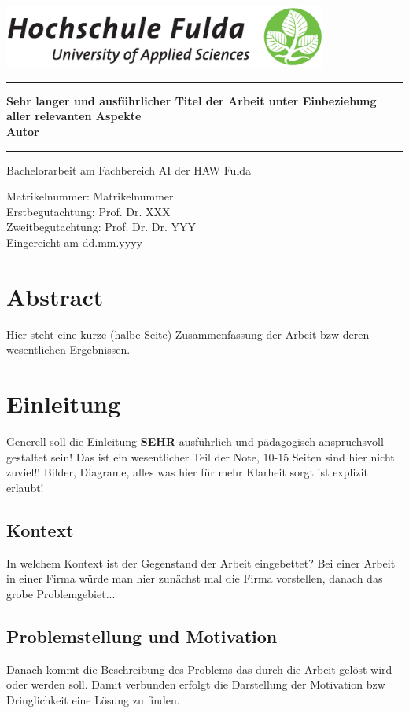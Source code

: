 \documentclass[12pt,oneside]{article}
\newcommand{\HSFTitle}[8]{

  \thispagestyle{empty}
\begin{center}
    \includegraphics[width=0.8\textwidth]{logo.eps} \\
    \vspace*{\stretch{1}}
    \end{center}

  {\parindent0cm
  \rule{\linewidth}{.7ex}}
  \begin{center}
    \vspace*{\stretch{1}}
    \sffamily\bfseries\Huge
    #1\\
    \vspace*{\stretch{1}}
    \sffamily\bfseries\large
    #3
    \vspace*{\stretch{1}}
  \end{center}
  \rule{\linewidth}{.7ex}

  \vspace*{\stretch{2}}
  \begin{center}
    \Large #2 am #5 der HAW Fulda \\
    \vspace*{\stretch{1}}

    \large Matrikelnummer:  #4 \\[1mm]
    \large Erstbegutachtung:  #7 \\[1mm]
    \large Zweitbegutachtung:  #8 \\[1mm]

    \vspace*{\stretch{1}}
    \large Eingereicht am #6
  \end{center}
}
\begin{document}
  \HSFTitle
      {Sehr langer und ausführlicher Titel der Arbeit unter Einbeziehung aller relevanten Aspekte }        %
      {Bachelorarbeit} %
      {Autor}          %
      {Matrikelnummer}
      {Fachbereich AI}  %
      {dd.mm.yyyy}        %
      {Prof. Dr. XXX}     %
      {Prof. Dr. Dr. YYY}    %

  \clearpage

\lhead{}
    \setcounter{page}{1}

\clearpage
%
\section*{Abstract}
Hier steht eine kurze (halbe Seite) Zusammenfassung der Arbeit bzw deren wesentlichen Ergebnissen.
\clearpage
\tableofcontents
\clearpage

\listoffigures

\listoftables
\clearpage


\cleardoublepage
{}
    \setcounter{page}{1}
\lhead{\nouppercase{\leftmark}}


\section{Einleitung} \label{sec:einleitung}
Generell soll die Einleitung \textbf{SEHR} ausführlich und pädagogisch anspruchsvoll gestaltet sein! Das ist ein wesentlicher Teil der Note, 10-15 Seiten sind hier nicht zuviel!!
Bilder, Diagrame, alles was hier für mehr Klarheit sorgt ist explizit erlaubt!
%
\subsection{Kontext}
In welchem Kontext ist der Gegenstand der Arbeit eingebettet? Bei einer Arbeit in einer Firma würde man hier zunächst mal die Firma vorstellen, danach das grobe Problemgebiet...
%
\subsection{Problemstellung und Motivation}
Danach kommt die Beschreibung des Problems das durch die Arbeit gelöst wird oder werden soll. Damit verbunden erfolgt die Darstellung der Motivation bzw Dringlichkeit eine Lösung zu finden. 
%
\end{document}
